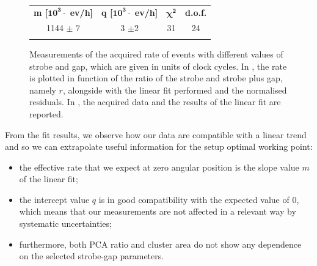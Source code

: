 \documentclass[../../main/main.tex]{subfiles}
\begin{document}
\begin{figure}[h]
\begin{minipage}[c]{0.49\linewidth}
{{{\begin{tabular}{ccc|ccc}
                    \multicolumn{2}{c}{\textbf{m [$\boldsymbol{10^3}\cdot$ ev/h]}}  &
                    \multicolumn{2}{c}{\textbf{q [$\boldsymbol{10^3}\cdot$ ev/h]}}  &              $\boldsymbol{\chi^2}$    &       \textbf{d.o.f.}      \\ 
                    \multicolumn{2}{c}{1144 $\pm$ 7}    & 
                    \multicolumn{2}{c}{3 $\pm $2}    & 31   & 24   \\
                    \botrule
                \end{tabular}
            }
            }
            \label{tab:strobe_data}
        }
    \end{minipage}
    \caption{Measurements of the acquired rate of events with different values of strobe and gap, which are given in units of clock cycles. In , the rate is plotted in function of the ratio of the strobe and strobe plus gap, namely \( r \), alongside with the linear fit performed and the normalised residuals. In , the acquired data and the results of the linear fit are reported.}
    \label{fig:strobe_analysis}
\end{figure}

From the fit results, we observe how our data are compatible with a linear trend and so we can extrapolate useful information for the setup optimal working point:
\begin{itemize}
    \item the effective rate that we expect at zero angular position is the slope value $m$ of the linear fit;
    \item the intercept value $q$ is in good compatibility with the expected value of \( 0 \), which means that our measurements are not affected in a relevant way by systematic uncertainties;
    \item furthermore, both PCA ratio and cluster area do not show any dependence on the selected strobe-gap parameters.
\end{itemize}
\end{document}
